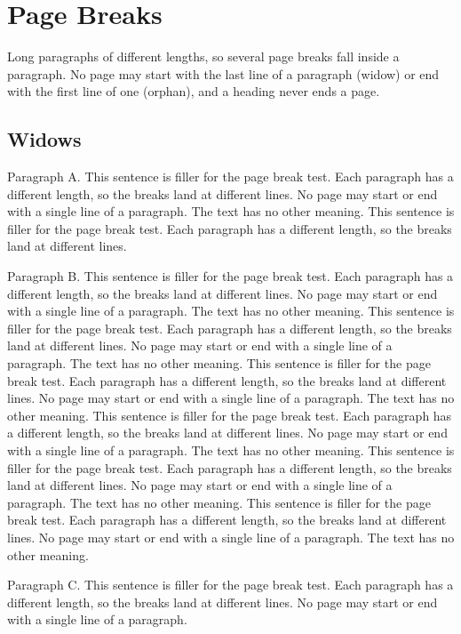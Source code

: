 \section{Page Breaks}

Long paragraphs of different lengths, so several page breaks fall inside a
paragraph. No page may start with the last line of a paragraph (widow) or end
with the first line of one (orphan), and a heading never ends a page.

\subsection{Widows}

Paragraph A. This sentence is filler for the page break test. Each paragraph
has a different length, so the breaks land at different lines. No page may
start or end with a single line of a paragraph. The text has no other meaning.
This sentence is filler for the page break test. Each paragraph has a
different length, so the breaks land at different lines.

Paragraph B. This sentence is filler for the page break test. Each paragraph
has a different length, so the breaks land at different lines. No page may
start or end with a single line of a paragraph. The text has no other meaning.
This sentence is filler for the page break test. Each paragraph has a
different length, so the breaks land at different lines. No page may start or
end with a single line of a paragraph. The text has no other meaning. This
sentence is filler for the page break test. Each paragraph has a different
length, so the breaks land at different lines. No page may start or end with a
single line of a paragraph. The text has no other meaning. This sentence is
filler for the page break test. Each paragraph has a different length, so the
breaks land at different lines. No page may start or end with a single line of
a paragraph. The text has no other meaning. This sentence is filler for the
page break test. Each paragraph has a different length, so the breaks land at
different lines. No page may start or end with a single line of a paragraph.
The text has no other meaning. This sentence is filler for the page break
test. Each paragraph has a different length, so the breaks land at different
lines. No page may start or end with a single line of a paragraph. The text
has no other meaning.

Paragraph C. This sentence is filler for the page break test. Each paragraph
has a different length, so the breaks land at different lines. No page may
start or end with a single line of a paragraph.

